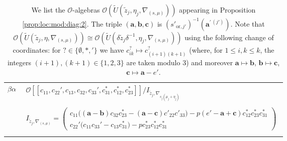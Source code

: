 \documentclass[oneside,a4paper,english, 11pt]{amsart}
\theoremstyle{plain}
\theoremstyle{plain}
\theoremstyle{plain}
\theoremstyle{plain}
\theoremstyle{plain}
\theoremstyle{plain}
\theoremstyle{definition}
\theoremstyle{definition}
\theoremstyle{definition}
\theoremstyle{remark}
\numberwithin{equation}{section}
\newcommand{\cO}{\mathcal{O}}
\newcommand{\tld}[1]{\widetilde{#1}}
\begin{document}
\begin{table}[H]
{\begin{tabular}{| c | c |}
$\beta \alpha$ &$\begin{matrix}\cO[\![c_{11},c_{22}', c_{13}, c_{32},  c_{33}', c_{31}^*, c_{12}^*, c_{23}^*]\!]/I_{\tld{z}_j,\nabla_{s_j(\mu_j+\eta_j)}} 
 \\ \\I_{\tld{z}_j,\nabla_{(s,\mu)}}=\left(\begin{array}{l}c_{11}\Big((\mathbf{a}-\mathbf{b})c_{32}c^*_{23}-(\mathbf{a}-\mathbf{c})c'_{22}c'_{33}\Big)-p(e'-\mathbf{a}+\mathbf{c})c^*_{12}c^*_{23}c^*_{31}
 \\c_{22}'\Big(c_{11} c_{33}' - c_{13} c^*_{31}\Big) - pc_{23}^*c_{12}^*c_{31}^*
 \end{array}\right)
\end{matrix} $\\
&\\
\hline
\end{tabular}}
%
\caption*{
We list the $\cO$-algebras $\cO(\tld{U}(\tld{z}_j,\eta_j,\nabla_{(s,\mu)}))$ appearing in Proposition \ref{prop:loc:mod:diag:2}. 
The triple $(\mathbf{a},\mathbf{b},\mathbf{c})$ is $(s'_{\mathrm{or}, j'})^{-1}(\mathbf{a}^{\prime \, (j')})$.
Note that $\cO(\tld{U}(\tld{z}_j,\eta,\nabla_{(s,\mu)}))\cong \cO(\tld{U}(\delta\tld{z}_j\delta^{-1},\eta_j,\nabla_{(s,\mu)}))$ using the following change of coordinates: for $?\in\{\emptyset,\ast,\prime\}$ we have $c^{?}_{ik}\mapsto c^{?}_{(i+1)(k+1)}$ (where, for $1\leq i,k\leq k$, the integers $(i+1), (k+1)\in\{1,2,3\}$ are taken modulo $3$) and moreover $\mathbf{a}\mapsto\mathbf{b}$, $\mathbf{b}\mapsto\mathbf{c}$, 
$\mathbf{c}\mapsto \mathbf{a}-e'$.
}
%
%
\end{table}
\end{document}
